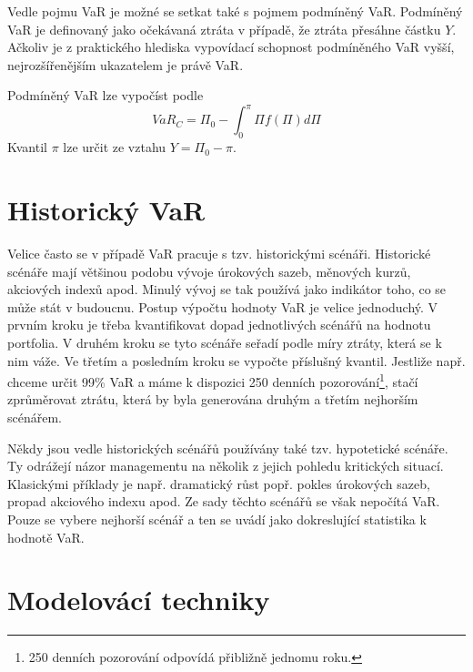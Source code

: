 \documentclass[a4paper]{book}
\begin{document}
Vedle pojmu VaR je možné se setkat také s pojmem podmíněný VaR. Podmíněný VaR je definovaný jako očekávaná ztráta v případě, že ztráta přesáhne částku $Y$. Ačkoliv je z praktického hlediska vypovídací schopnost podmíněného VaR vyšší, nejrozšířenějším ukazatelem je právě VaR.

Podmíněný VaR lze vypočíst podle
\begin{equation*}
VaR_C = \Pi_0 - \int_0^\pi \Pi f(\Pi)d\Pi
\end{equation*}
Kvantil $\pi$ lze určit ze vztahu $Y = \Pi_0 - \pi$.

\section{Historický VaR}

Velice často se v případě VaR pracuje s tzv. historickými scénáři. Historické scénáře mají většinou podobu vývoje úrokových sazeb, měnových kurzů, akciových indexů apod. Minulý vývoj se tak používá jako indikátor toho, co se může stát v budoucnu. Postup výpočtu hodnoty VaR je velice jednoduchý. V prvním kroku je třeba kvantifikovat dopad jednotlivých scénářů na hodnotu portfolia. V druhém kroku se tyto scénáře seřadí podle míry ztráty, která se k nim váže. Ve třetím a posledním kroku se vypočte příslušný kvantil. Jestliže např. chceme určit 99\% VaR a máme k dispozici 250 denních pozorování\footnote{250 denních pozorování odpovídá přibližně jednomu roku.}, stačí zprůměrovat ztrátu, která by byla generována druhým a třetím nejhorším scénářem.

Někdy jsou vedle historických scénářů používány také tzv. hypotetické scénáře. Ty odrážejí názor managementu na několik z jejich pohledu kritických situací. Klasickými příklady je např. dramatický růst popř. pokles úrokových sazeb, propad akciového indexu apod. Ze sady těchto scénářů se však nepočítá VaR. Pouze se vybere nejhorší scénář a ten se uvádí jako dokreslující statistika k hodnotě VaR.

\section{Modelovácí techniky}
\end{document}

